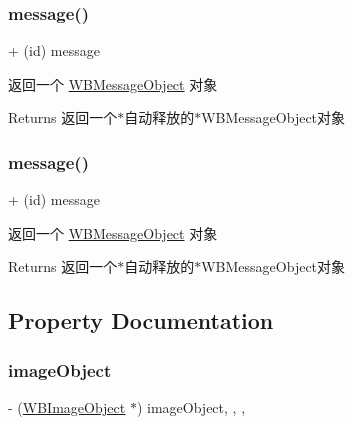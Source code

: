 \subsubsection{\texorpdfstring{message()}{message()}\hspace{0.1cm}{\footnotesize\ttfamily [2/3]}}
{\footnotesize\ttfamily + (id) message \begin{DoxyParamCaption}{ }\end{DoxyParamCaption}}

返回一个 \mbox{\hyperlink{interface_w_b_message_object}{W\+B\+Message\+Object}} 对象

\begin{DoxyReturn}{Returns}
返回一个$\ast$自动释放的$\ast$\+W\+B\+Message\+Object对象 
\end{DoxyReturn}
\mbox{\label{interface_w_b_message_object_a653a30fc2b63ed605063309fdecb4d05}} 
\subsubsection{\texorpdfstring{message()}{message()}\hspace{0.1cm}{\footnotesize\ttfamily [3/3]}}
{\footnotesize\ttfamily + (id) message \begin{DoxyParamCaption}{ }\end{DoxyParamCaption}}

返回一个 \mbox{\hyperlink{interface_w_b_message_object}{W\+B\+Message\+Object}} 对象

\begin{DoxyReturn}{Returns}
返回一个$\ast$自动释放的$\ast$\+W\+B\+Message\+Object对象 
\end{DoxyReturn}


\subsection{Property Documentation}
\mbox{\label{interface_w_b_message_object_ad24e852cfd5ecb92c900f24fd3624dba}} 
\subsubsection{\texorpdfstring{image\+Object}{imageObject}}
{\footnotesize\ttfamily -\/ (\mbox{\hyperlink{interface_w_b_image_object}{W\+B\+Image\+Object}} $\ast$) image\+Object\hspace{0.3cm}{\ttfamily [read]}, {\ttfamily [write]}, {\ttfamily [nonatomic]}, {\ttfamily [strong]}}

